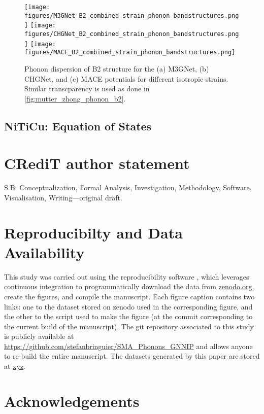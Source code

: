 \documentclass[preprint]{elsarticle}
\begin{document}
\begin{figure}[ht!]
    \begin{centering}
      \texttt{[image: figures/M3GNet\_B2\_combined\_strain\_phonon\_bandstructures.png]}
      \vspace{1mm}
      \texttt{[image: figures/CHGNet\_B2\_combined\_strain\_phonon\_bandstructures.png]}
      \vspace{1mm}
      \texttt{[image: figures/MACE\_B2\_combined\_strain\_phonon\_bandstructures.png]}
      \caption{
        Phonon dispersion of B2 structure for the (a) M3GNet, (b) CHGNet, and (c) MACE potentials for different isotropic strains. Similar transcparency is used as done in \ref{fig:mutter_zhong_phonon_b2}.
      }
      \label{fig:gnn_phonon_b2}
    \end{centering}
\end{figure}



\subsection{NiTiCu: Equation of States}






\section*{CR\lowercase{e}d\lowercase{i}T author statement}

S.B: Conceptualization, Formal Analysis, Investigation, Methodology, Software, Visualisation, Writing---original draft.


\section*{Reproducibilty and Data Availability}
This study was carried out using the reproducibility software \href{https://github.com/showyourwork/showyourwork}{\showyourwork} \cite{Luger2021}, which leverages continuous integration to programmatically download the data from \href{https://zenodo.org/}{zenodo.org}, create the figures, and compile the manuscript. Each figure caption contains two links: one to the dataset stored on zenodo used in the corresponding figure, and the other to the script used to make the figure (at the commit corresponding to the current build of the manuscript). The git repository associated to this study is publicly available at \url{https://github.com/stefanbringuier/SMA_Phonons_GNNIP} and allows anyone to re-build the entire manuscript. The datasets generated by this paper are stored at \url{xyz}.

\section*{Acknowledgements}

\appendix
\end{document}
